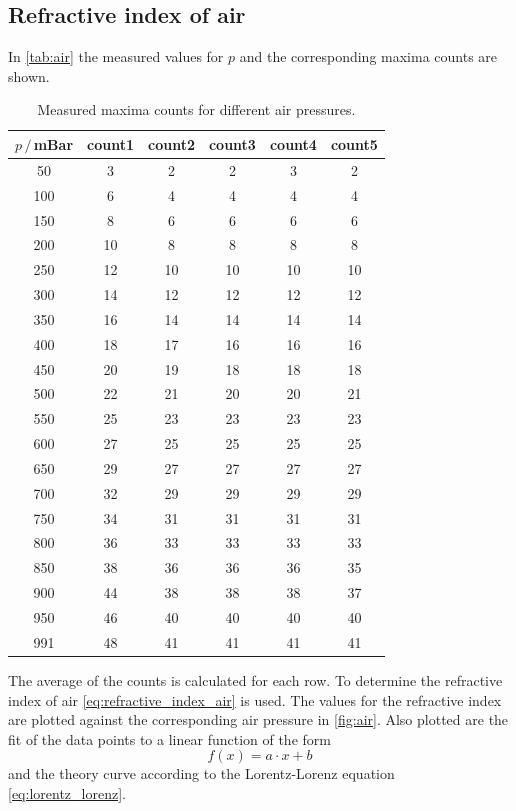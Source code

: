 \subsection{Refractive index of air}
In \autoref{tab:air} the measured values for $p$ and the corresponding maxima counts are shown.
\begin{table}[H]
  \centering
  \begin{tabular}{c|c|c|c|c|c}
  \hline
  $p\,/\,$mBar & count1 & count2 & count3 & count4 & count5 \\ \hline
  \hline
  50 & 3 & 2 & 2 & 3 & 2 \\ \hline
  100 & 6 & 4 & 4 & 4 & 4 \\ \hline
  150 & 8 & 6 & 6 & 6 & 6 \\ \hline
  200 & 10 & 8 & 8 & 8 & 8 \\ \hline
  250 & 12 & 10 & 10 & 10 & 10 \\ \hline
  300 & 14 & 12 & 12 & 12 & 12 \\ \hline
  350 & 16 & 14 & 14 & 14 & 14 \\ \hline
  400 & 18 & 17 & 16 & 16 & 16 \\ \hline
  450 & 20 & 19 & 18 & 18 & 18 \\ \hline
  500 & 22 & 21 & 20 & 20 & 21 \\ \hline
  550 & 25 & 23 & 23 & 23 & 23 \\ \hline
  600 & 27 & 25 & 25 & 25 & 25 \\ \hline
  650 & 29 & 27 & 27 & 27 & 27 \\ \hline
  700 & 32 & 29 & 29 & 29 & 29 \\ \hline
  750 & 34 & 31 & 31 & 31 & 31 \\ \hline
  800 & 36 & 33 & 33 & 33 & 33 \\ \hline
  850 & 38 & 36 & 36 & 36 & 35 \\ \hline
  900 & 44 & 38 & 38 & 38 & 37 \\ \hline
  950 & 46 & 40 & 40 & 40 & 40 \\ \hline
  991 & 48 & 41 & 41 & 41 & 41 \\ \hline
  \end{tabular}
  \caption{Measured maxima counts for different air pressures.}
  \label{tab:air}
\end{table}
The average of the counts is calculated for each row. To determine the refractive index of air
\autoref{eq:refractive_index_air} is used. The values for the refractive index are plotted against
the corresponding air pressure in \autoref{fig:air}. Also plotted are the fit of the data points to a linear function of the form
\begin{equation}
  f(x) = a \cdot x + b
\end{equation}
and the theory curve according to the Lorentz-Lorenz equation \autoref{eq:lorentz_lorenz}.

